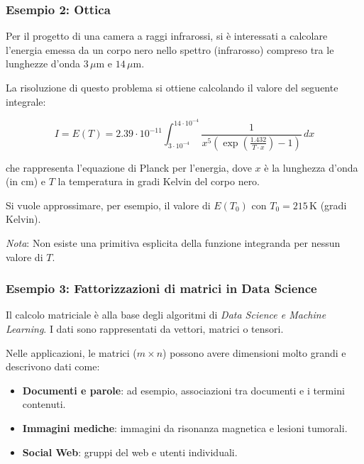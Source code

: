\documentclass[a4paper, 11pt]{article}
\begin{document}
        \subsubsection*{Esempio 2: Ottica}

        Per il progetto di una camera a raggi infrarossi, si è interessati a calcolare l’energia emessa da un corpo nero nello spettro (infrarosso) compreso tra le lunghezze d’onda \(3 \, \mu \mathrm{m}\) e \(14 \, \mu \mathrm{m}\).

        La risoluzione di questo problema si ottiene calcolando il valore del seguente integrale:



        \[
            I = E(T) = 2.39 \cdot 10^{-11} \int_{3 \cdot 10^{-4}}^{14 \cdot 10^{-4}} \frac{1}{x^5 \left( \exp\left(\frac{1.432}{T \cdot x}\right) - 1 \right)} \, dx
        \]



        che rappresenta l’equazione di Planck per l’energia, dove \(x\) è la lunghezza d’onda (in cm) e \(T\) la temperatura in gradi Kelvin del corpo nero.

        Si vuole approssimare, per esempio, il valore di \(E(T_0)\) con \(T_0 = 215 \, \text{K}\) (gradi Kelvin).

        \textit{Nota}: Non esiste una primitiva esplicita della funzione integranda per nessun valore di \(T\).


        \subsubsection*{Esempio 3: Fattorizzazioni di matrici in Data Science}

            Il calcolo matriciale è alla base degli algoritmi di \textit{Data Science e Machine Learning}. I dati sono rappresentati da vettori, matrici o tensori.

            Nelle applicazioni, le matrici ($m \times n$) possono avere dimensioni molto grandi e descrivono dati come:
            \begin{itemize}
                \item \textbf{Documenti e parole}: ad esempio, associazioni tra documenti e i termini contenuti.
                \item \textbf{Immagini mediche}: immagini da risonanza magnetica e lesioni tumorali.
                \item \textbf{Social Web}: gruppi del web e utenti individuali.
            \end{itemize}
\end{document}
